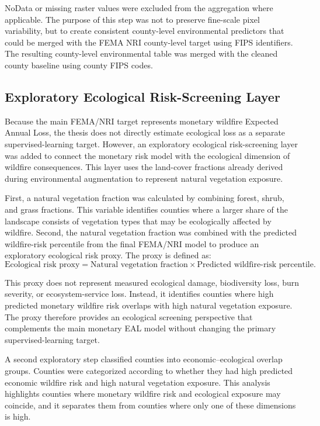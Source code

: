 NoData or missing raster values were excluded from the aggregation where applicable. The purpose of this step was not to preserve fine-scale pixel variability, but to create consistent county-level environmental predictors that could be merged with the FEMA NRI county-level target using FIPS identifiers. The resulting county-level environmental table was merged with the cleaned county baseline using county FIPS codes.

\subsection{Exploratory Ecological Risk-Screening Layer}

Because the main FEMA/NRI target represents monetary wildfire Expected Annual Loss, the thesis does not directly estimate ecological loss as a separate supervised-learning target. However, an exploratory ecological risk-screening layer was added to connect the monetary risk model with the ecological dimension of wildfire consequences. This layer uses the land-cover fractions already derived during environmental augmentation to represent natural vegetation exposure.

First, a natural vegetation fraction was calculated by combining forest, shrub, and grass fractions. This variable identifies counties where a larger share of the landscape consists of vegetation types that may be ecologically affected by wildfire. Second, the natural vegetation fraction was combined with the predicted wildfire-risk percentile from the final FEMA/NRI model to produce an exploratory ecological risk proxy. The proxy is defined as:
\[
\text{Ecological risk proxy} = \text{Natural vegetation fraction} \times \text{Predicted wildfire-risk percentile}.
\]

This proxy does not represent measured ecological damage, biodiversity loss, burn severity, or ecosystem-service loss. Instead, it identifies counties where high predicted monetary wildfire risk overlaps with high natural vegetation exposure. The proxy therefore provides an ecological screening perspective that complements the main monetary EAL model without changing the primary supervised-learning target.

A second exploratory step classified counties into economic--ecological overlap groups. Counties were categorized according to whether they had high predicted economic wildfire risk and high natural vegetation exposure. This analysis highlights counties where monetary wildfire risk and ecological exposure may coincide, and it separates them from counties where only one of these dimensions is high.

